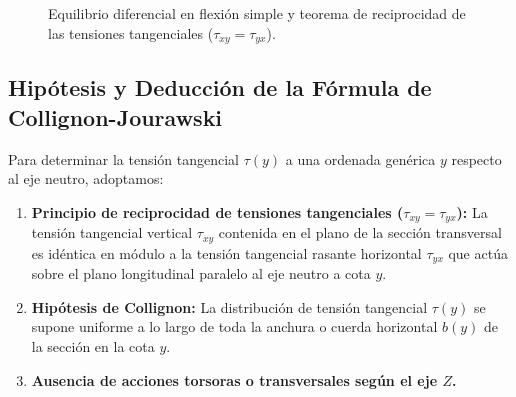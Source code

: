 \begin{figure}[H]
{%
    }
    \caption{Equilibrio diferencial en flexión simple y teorema de reciprocidad de las tensiones tangenciales ($\tau_{xy} = \tau_{yx}$).}
    \label{fig:flexion_simple_reciprocidad}
\end{figure}

\subsection{Hipótesis y Deducción de la Fórmula de Collignon-Jourawski}

Para determinar la tensión tangencial $\tau(y)$ a una ordenada genérica $y$ respecto al eje neutro, adoptamos:
\begin{enumerate}
    \item \textbf{Principio de reciprocidad de tensiones tangenciales ($\tau_{xy} = \tau_{yx}$):} La tensión tangencial vertical $\tau_{xy}$ contenida en el plano de la sección transversal es idéntica en módulo a la tensión tangencial rasante horizontal $\tau_{yx}$ que actúa sobre el plano longitudinal paralelo al eje neutro a cota $y$.
    \item \textbf{Hipótesis de Collignon:} La distribución de tensión tangencial $\tau(y)$ se supone uniforme a lo largo de toda la anchura o cuerda horizontal $b(y)$ de la sección en la cota $y$.
    \item \textbf{Ausencia de acciones torsoras o transversales según el eje $Z$.}
\end{enumerate}

